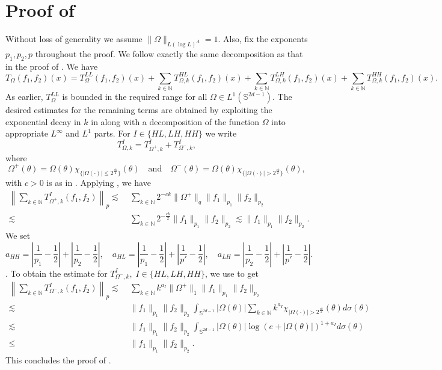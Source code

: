 \documentclass[a4paper,reqno]{amsart}
\newcommand{\N}{{\mathbb N}}
\newcommand{\Sp}{{\mathbb S}}
\theoremstyle{definition}
\numberwithin{equation}{section}
\begin{document}
\section{Proof of }\label{sec:proofrough1}
Without loss of generality we assume $\|\Omega\|_{L(\log L)^A}=1$. Also,  fix the exponents $p_1,p_2,p$ throughout the proof. We follow exactly the same decomposition as that in the proof of . We have
\[T_\Omega(f_1,f_2)(x)=T_{\Omega}^{LL}(f_1,f_2)(x)+\sum_{k\in\N}T_{\Omega,k}^{HL}(f_1,f_2)(x)+\sum_{k\in\N}T_{\Omega,k}^{LH}(f_1,f_2)(x)+\sum_{k\in\N}T_{\Omega,k}^{HH}(f_1,f_2)(x).\]
As earlier, $T_\Omega^{LL}$ is bounded in the required range for all $\Omega\in L^1(\Sp^{2d-1})$. The desired estimates for the remaining terms are obtained by exploiting the exponential decay in $k$ in  along with a decomposition of the function $\Omega$ into appropriate $L^\infty$ and $L^1$ parts. For $I\in\{HL,LH,HH\}$ we write 
\[T_{\Omega,k}^I=T_{\Omega^+,k}^I+T_{\Omega^-,k}^I, \]
where 
\[\Omega^+(\theta)=\Omega(\theta)\chi_{\{|\Omega(\cdot)|\leq2^{\frac{ck}{2}}\}}(\theta)\quad\text{and}\quad \Omega^-(\theta)=\Omega(\theta)\chi_{\{|\Omega(\cdot)|>2^{\frac{ck}{2}}\}}(\theta),\]
with $c>0$ is as in . Applying , we have
\begin{align*}
	\left\|\sum_{k\in\N}T_{\Omega^+,k}^{I}(f_1,f_2)\right\|_p\lesssim&\;\sum_{k\in\N}2^{-ck}\|\Omega^+\|_q\|f_1\|_{p_1}\|f_2\|_{p_2}\\
	\lesssim&\;\sum_{k\in\N}2^{-\frac{ck}{2}}\|f_1\|_{p_1}\|f_2\|_{p_2}\lesssim\|f_1\|_{p_1}\|f_2\|_{p_2}.
\end{align*}
We set 
\[a_{HH}=\left|\frac{1}{p_1}-\frac{1}{2}\right|+\left|\frac{1}{p_2}-\frac{1}{2}\right|,\quad a_{HL}=\left|\frac{1}{p_1}-\frac{1}{2}\right|+\left|\frac{1}{p'}-\frac{1}{2}\right|,\quad a_{LH}=\left|\frac{1}{p_2}-\frac{1}{2}\right|+\left|\frac{1}{p'}-\frac{1}{2}\right|.\].
To obtain the estimate for $T_{\Omega^-,k}^{I},\;I\in\{HL,LH,HH\}$, we use  to get
\begin{align*}
	\left\|\sum_{k\in\N}T_{\Omega^-,k}^{I}(f_1,f_2)\right\|_p\lesssim&\;\sum_{k\in\N}k^{a_I}\|\Omega^+\|_1\|f_1\|_{p_1}\|f_2\|_{p_2}\\
	\lesssim&\;\|f_1\|_{p_1}\|f_2\|_{p_2}\int_{\Sp^{2d-1}}|\Omega(\theta)|\sum_{k\in\N}k^{a_I}\chi_{|\Omega(\cdot)|>2^{\frac{ck}{2}}}(\theta)d\sigma(\theta)\\
	\lesssim&\;\|f_1\|_{p_1}\|f_2\|_{p_2}\int_{\Sp^{2d-1}}|\Omega(\theta)|\log(e+|\Omega(\theta)|)^{1+{a_I}}d\sigma(\theta)\\
	\leq&\;\|f_1\|_{p_1}\|f_2\|_{p_2}.
\end{align*}
This concludes the proof of .
\end{document}
